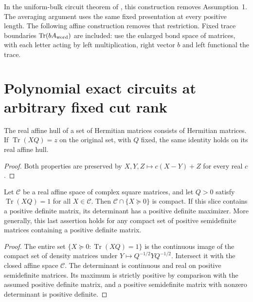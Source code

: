 In the uniform-bulk circuit theorem of \cite{Styliaris2025MPUCircuits},
this construction removes Assumption~1. The averaging argument uses the same
fixed presentation at every positive length. The following affine
construction removes that restriction.
Fixed trace boundaries $\operatorname{Tr}(bA_{\rm word})$ are included:
use the enlarged bond space of matrices, with each letter acting by
left multiplication, right vector $b$ and left functional the trace.

\section{Polynomial exact circuits at arbitrary fixed cut rank}

\begin{lemma}
    \label{thm:mpu_real_affine_gram_identities}
    \leanok
    The real affine hull of a set of Hermitian matrices consists of
    Hermitian matrices. If $\operatorname{Tr}(XQ)=z$ on the original
    set, with $Q$ fixed, the same identity holds on its real affine hull.
\end{lemma}
\begin{proof}\leanok
    Both properties are preserved by
    $X,Y,Z\mapsto c(X-Y)+Z$ for every real $c$.
\end{proof}

\begin{lemma}
    \label{thm:mpu_compact_affine_gram_slice}
    \leanok
    Let $\mathcal C$ be a real affine space of complex square matrices,
    and let $Q>0$ satisfy $\operatorname{Tr}(XQ)=1$ for all
    $X\in\mathcal C$. Then $\mathcal C\cap\{X\succeq0\}$ is compact.
    If this slice contains a positive definite matrix, its determinant
    has a positive definite maximizer. More generally, this last
    assertion holds for any compact set of positive semidefinite
    matrices containing a positive definite matrix.
\end{lemma}
\begin{proof}\leanok
    The entire set $\{X\succeq0:\operatorname{Tr}(XQ)=1\}$ is the
    continuous image of the compact set of density matrices under
    $Y\mapsto Q^{-1/2}YQ^{-1/2}$. Intersect it with the closed affine
    space $\mathcal C$. The determinant is continuous and real on
    positive semidefinite matrices. Its maximum is strictly positive
    by comparison with the assumed positive definite matrix, and a
    positive semidefinite matrix with nonzero determinant is positive
    definite.
\end{proof}

